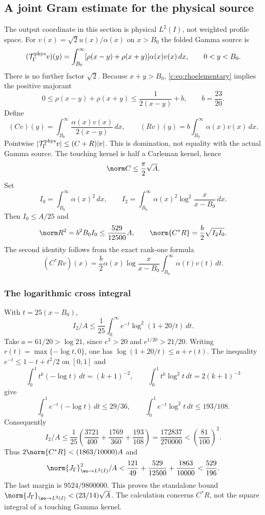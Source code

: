 \documentclass[11pt,a4paper]{article}
\numberwithin{equation}{section}
\theoremstyle{definition}\newtheorem{definition}[theorem]{Definition}
\theoremstyle{remark}\newtheorem{remark}[theorem]{Remark}
\begin{document}
\subsection{A joint Gram estimate for the physical source}\label{c:sec:joint}
The output coordinate in this section is physical $L^2(I)$, not weighted profile space.
For $v(x)=\sqrt2u(x)/\alpha(x)$ on $x>{B_0}$ the folded Gamma source is
\[
 (\mathcal T_\Gamma^{\rm phys}v)(y)=\int_{B_0}^\infty
 [\rho(x-y)+\rho(x+y)]\alpha(x)v(x)\,dx,\qquad0<y<{B_0}.
\]
There is no further factor $\sqrt2$.
Because $x+y>{B_0}$, \eqref{c:eq:rhoelementary} implies the positive majorant
\[
 0\le\rho(x-y)+\rho(x+y)\le\frac1{2(x-y)}+b,\qquad b=\frac{23}{20}.
\]
Define
\[
 (Cv)(y)=\int_{B_0}^\infty\frac{\alpha(x)v(x)}{2(x-y)}\,dx,\qquad
 (Rv)(y)=b\int_{B_0}^\infty\alpha(x)v(x)\,dx.
\]
Pointwise $|\mathcal T_\Gamma^{\rm phys}v|\le(C+R)|v|$.
This is domination, not equality with the actual Gamma source.
The touching kernel is half a Carleman kernel, hence
\[
 \norm C\le\frac\pi2\sqrt A.
\]
Set
\[
 I_0=\int_{B_0}^\infty\alpha(x)^2\,dx,\qquad
 I_2=\int_{B_0}^\infty\alpha(x)^2\log^2\frac{x}{x-{B_0}}\,dx.
\]
Then $I_0\le A/25$ and
\begin{equation}\label{c:eq:regulargram}
 \norm R^2=b^2B_0I_0\le\frac{529}{12500}A,\qquad
 \norm{C^*R}=\frac b2\sqrt{I_2I_0}.
\end{equation}
The second identity follows from the exact rank-one formula
\[
 (C^*Rv)(x)=\frac b2\alpha(x)\log\frac{x}{x-{B_0}}
                  \int_{B_0}^\infty\alpha(t)v(t)\,dt.
\]

\subsubsection{The logarithmic cross integral}
With $t=25(x-{B_0})$,
\[
 I_2/A\le\frac1{25}\int_0^\infty e^{-t}\log^2(1+20/t)\,dt.
\]
Take $a=61/20>\log21$, since $e^3>20$ and $e^{1/20}>21/20$.
Writing $r(t)=\max\{-\log t,0\}$, one has
$\log(1+20/t)\le a+r(t)$.
The inequality $e^{-t}\le1-t+t^2/2$ on $[0,1]$ and
\[
 \int_0^1t^k(-\log t)\,dt=(k+1)^{-2},\qquad
 \int_0^1t^k\log^2t\,dt=2(k+1)^{-3}
\]
give
\[
 \int_0^1e^{-t}(-\log t)\,dt\le29/36,\qquad
 \int_0^1e^{-t}\log^2t\,dt\le193/108.
\]
Consequently
\begin{equation}\label{c:eq:I2}
 I_2/A\le\frac1{25}\left(\frac{3721}{400}+
       \frac{1769}{360}+\frac{193}{108}\right)
 =\frac{172837}{270000}<\left(\frac{81}{100}\right)^2.
\end{equation}
Thus $2\norm{C^*R}<(1863/10000)A$ and
\begin{equation}\label{c:eq:gammajoint}
 \norm{J_\Gamma}_{\wo\to L^2(I)}^2/A
 <\frac{121}{49}+\frac{529}{12500}+\frac{1863}{10000}
 <\frac{529}{196}.
\end{equation}
The last margin is $9524/9800000$.
This proves the standalone bound
$\norm{J_\Gamma}_{\wo\to L^2(I)}<(23/14)\sqrt A$.
The calculation concerns $C^*R$, not the square integral of a touching Gamma kernel.
\end{document}

